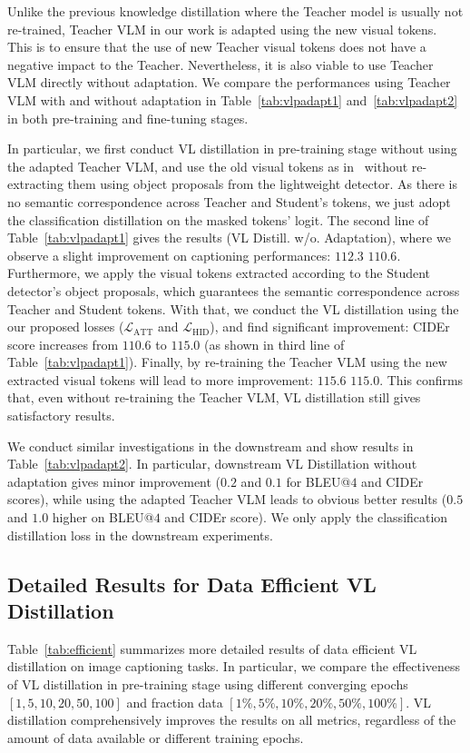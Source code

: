 Unlike the previous knowledge distillation where the Teacher model is usually not re-trained, Teacher VLM in our work is adapted using the new visual tokens. This is to ensure that the use of new Teacher visual tokens does not have a negative impact to the Teacher. Nevertheless, it is also viable to use Teacher VLM directly without adaptation. We compare the performances using Teacher VLM with and without adaptation in Table~\ref{tab:vlpadapt1} and~\ref{tab:vlpadapt2} in both pre-training and fine-tuning stages. 

In particular, we first conduct VL distillation in pre-training stage without using the adapted Teacher VLM, and use the old visual tokens as in~\cite{li2020oscar} without re-extracting them using object proposals from the lightweight detector. As there is no semantic correspondence across Teacher and Student's tokens, we just adopt the classification distillation on the masked tokens' logit. The second line of Table~\ref{tab:vlpadapt1} gives the results (VL Distill. w/o. Adaptation), where we observe a slight improvement on captioning performances: $112.3$ \vs $110.6$. Furthermore, we apply the visual tokens extracted according to the Student detector's object proposals, which guarantees the semantic correspondence across Teacher and Student tokens. With that, we conduct the VL distillation using the our proposed losses ($\mathcal{L}_\text{ATT}$ and $\mathcal{L}_\text{HID}$), and find significant improvement: CIDEr score increases from $110.6$ to $115.0$ (as shown in third line of Table~\ref{tab:vlpadapt1}). Finally, by re-training the Teacher VLM using the new extracted visual tokens will lead to more improvement: $115.6$ \vs $115.0$. This confirms that, even without re-training the Teacher VLM, VL distillation still gives satisfactory results.

We conduct similar investigations in the downstream and show results in Table~\ref{tab:vlpadapt2}. In particular, downstream VL Distillation without adaptation gives minor improvement ($0.2$ and $0.1$ for BLEU@$4$ and CIDEr scores), while using the adapted Teacher VLM leads to obvious better results ($0.5$ and $1.0$ higher on BLEU@$4$ and CIDEr score). We only apply the classification distillation loss in the downstream experiments.


\subsection*{Detailed Results for Data Efficient VL Distillation }
Table~\ref{tab:efficient} summarizes more detailed results of data efficient VL distillation on image captioning tasks.  In particular, we compare the effectiveness of  VL distillation in pre-training stage using different converging epochs $[1, 5, 10, 20, 50, 100]$ and fraction data $[1\%, 5\%, 10\%, 20\%, 50\%, 100\%]$.  VL distillation comprehensively improves the results on all metrics, regardless of the amount of data available or different training epochs.




